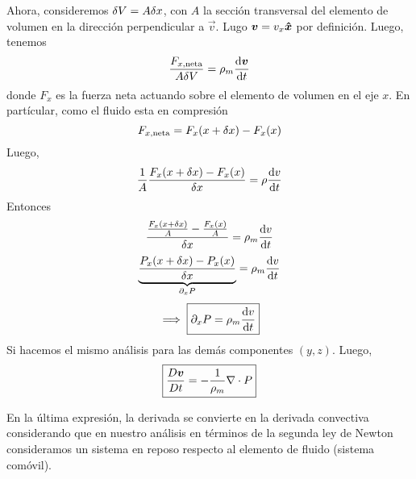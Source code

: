 Ahora, consideremos $\delta V=A\delta x$, con $A$ la sección transversal del elemento de volumen en la dirección perpendicular a $\vec{v}$. Lugo $\vb*{v}=v_x\vu*{x}$ por definición. Luego, tenemos
\begin{equation}
  \frac{F_{x,\rm neta}}{A\delta V}=\rho_m\dv{\vb*{v	}}{t}
\end{equation}
donde $F_x$ es la fuerza neta actuando sobre el elemento de volumen en el eje $x$. En partícular, como el fluido esta en compresión
\begin{equation}
F_{x,\rm neta}=F_x(x+\delta x)-F_x(x)
\end{equation}
Luego,
\begin{equation}
  \frac{1}{A}\frac{F_x(x+\delta x)-F_x(x)}{\delta x}=\rho\dv{v}{t}
\end{equation}
Entonces
\begin{equation}
  \frac{\frac{F_x(x+\delta x)}{A}-\frac{F_x(x)}{A}}{\delta x}=\rho_m\dv{v}{t}
\end{equation}
\begin{equation}
  \underbrace{\frac{P_x(x+\delta x)-P_x(x)}{\delta x}}_{\partial_x P}=\rho_m \dv{v}{t}
\end{equation}
\begin{equation}
 \implies \boxed{\partial_x P=\rho_m\dv{v}{t}}
\end{equation}
Si hacemos el mismo análisis para las demás componentes $(y,z)$. Luego,
\begin{equation}
\boxed{  \frac{D \vb*{v}}{D t}=-\frac{1}{\rho_m}\nabla\cdot P}
\end{equation}

En la última expresión, la derivada se convierte en la derivada convectiva considerando que en nuestro análisis en términos de la segunda ley de Newton consideramos un sistema en reposo respecto al elemento de fluido (sistema comóvil).












































